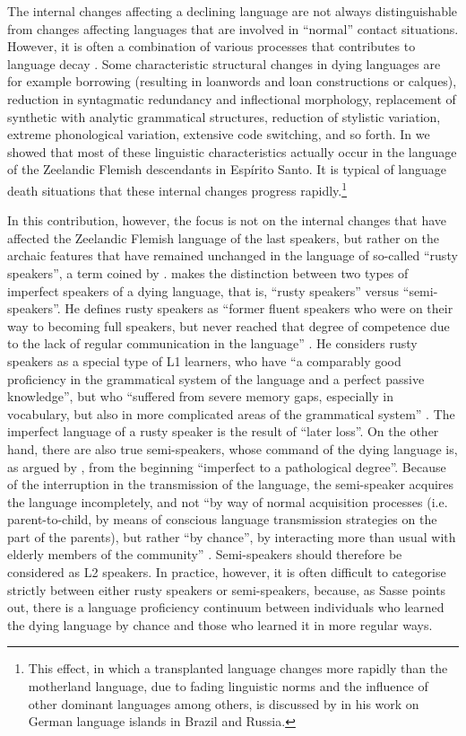 \documentclass[output=paper,hidelinks,draftmode]{langscibook}
\begin{document}
The internal changes affecting a declining language are not always distinguishable from changes affecting languages that are involved in ``normal'' contact situations. However, it is often a combination of various processes that contributes to language decay \citep[188]{CampbellMuntzel1989}. Some characteristic structural changes in dying languages are for example borrowing (resulting in loanwords and loan constructions or calques), reduction in syntagmatic redundancy and inflectional morphology, replacement of synthetic with analytic grammatical structures, reduction of stylistic variation, extreme phonological variation, extensive code switching, and so forth. In \citet[453--465]{SchaffelBremenkampPostma2017} we showed that most of these linguistic characteristics actually occur in the language of the Zeelandic Flemish descendants in Espírito Santo. It is typical of language death situations that these internal changes progress rapidly.\footnote{This effect, in which a transplanted language changes more rapidly than the motherland language, due to fading linguistic norms and the influence of other dominant languages among others, is discussed by \citet{Rosenberg2005} in his work on German language islands in Brazil and Russia.}

In this contribution, however, the focus is not on the internal changes that have affected the Zeelandic Flemish language of the last speakers, but rather on the archaic features that have remained unchanged in the language of so-called ``rusty speakers'', a term coined by \citet{Sasse1992}. \citeauthor{Sasse1992} makes the distinction between two types of imperfect speakers of a dying language, that is, ``rusty speakers'' versus ``semi-speakers''. He defines rusty speakers as “former fluent speakers who were on their way to becoming full speakers, but never reached that degree of competence due to the lack of regular communication in the language” \citep[62]{Sasse1992}. He considers rusty speakers as a special type of L1 learners, who have “a comparably good proficiency in the grammatical system of the language and a perfect passive knowledge”, but who “suffered from severe memory gaps, especially in vocabulary, but also in more complicated areas of the grammatical system” \citep[61]{Sasse1992}. The imperfect language of a rusty speaker is the result of “later loss”. On the other hand, there are also true semi-speakers, whose command of the dying language is, as argued by \citet[61]{Sasse1992}, from the beginning “imperfect to a pathological degree”. Because of the interruption in the transmission of the language, the semi-speaker acquires the language incompletely, and not “by way of normal acquisition processes (i.e. parent-to-child, by means of conscious language transmission strategies on the part of the parents), but rather ``by chance'', by interacting more than usual with elderly members of the community” \citep[36--37]{Rottet1995}. Semi-speakers should therefore be considered as L2 speakers. In practice, however, it is often difficult to categorise strictly between either rusty speakers or semi-speakers, because, as Sasse points out, there is a language proficiency continuum between individuals who learned the dying language by chance and those who learned it in more regular ways.
\end{document}
